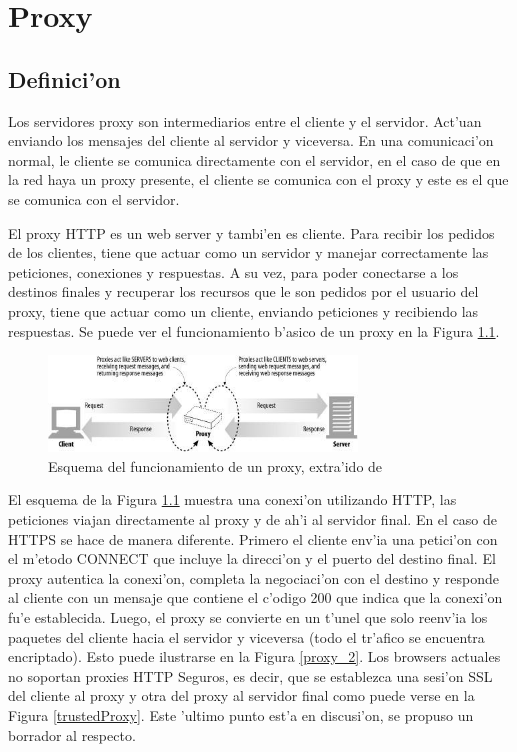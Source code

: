 \chapter{Proxy}
\label{proxy}
\section{Definici'on}

Los servidores proxy son intermediarios entre el cliente y el servidor. Act'uan enviando los mensajes del cliente al servidor y viceversa. En una comunicaci'on normal, le cliente se comunica directamente con el servidor, en el caso de que en la red haya un proxy presente, el cliente se comunica con el proxy y este es el que se comunica con el servidor.

El proxy HTTP es un web server y tambi'en es cliente. Para recibir los pedidos de los clientes, tiene que actuar como un servidor y manejar correctamente las peticiones, conexiones y respuestas. A su vez, para poder conectarse a los destinos finales y recuperar los recursos que le son pedidos por el usuario del proxy, tiene que actuar como un cliente, enviando peticiones y recibiendo las respuestas. Se puede ver el funcionamiento b'asico de un proxy en la Figura \ref{proxy_1}.

\begin{figure}[ht!]
  	\centering
	\includegraphics[width=310px]{img/proxy_1}
	\caption{\small Esquema del funcionamiento de un proxy, extra'ido de \cite{httpGuide}}
	\label{proxy_1}
\end{figure}

El esquema de la Figura \ref{proxy_1} muestra una conexi'on utilizando HTTP, las peticiones viajan directamente al proxy y de ah'i al servidor final. En el caso de HTTPS se hace de manera diferente. Primero el cliente env'ia una petici'on con el m'etodo CONNECT que incluye la direcci'on y el puerto del destino final. El proxy autentica la conexi'on, completa la negociaci'on con el destino y responde al cliente con un mensaje que contiene el c'odigo 200 que indica que la conexi'on fu'e establecida. Luego, el proxy se convierte en un t'unel que solo reenv'ia los paquetes del cliente hacia el servidor y viceversa (todo el tr'afico se encuentra encriptado). Esto puede ilustrarse en la Figura \ref{proxy_2}.
\label{mitm}
Los browsers actuales no soportan proxies HTTP Seguros, es decir, que se establezca una sesi'on SSL del cliente al proxy y otra del proxy al servidor final como puede verse en la Figura \ref{trustedProxy}. Este 'ultimo punto est'a en discusi'on, se propuso un borrador \citep{draftTrustedProxy} al respecto.

